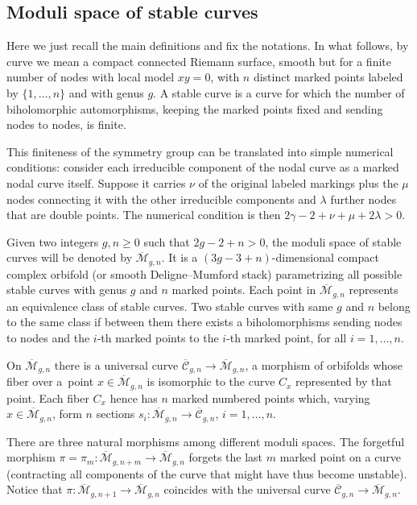 \documentclass[pdftex]{sigma}
\numberwithin{equation}{section}
\newcommand{\oM}{\overline{\mathcal M}}
\newcommand{\<}{\left<}
\renewcommand{\>}{\right>}
\begin{document}
\subsection{Moduli space of stable curves} Here we just recall the main def\/initions and f\/ix the notations. In what follows, by curve we mean a compact connected Riemann surface, smooth but for a f\/inite number of nodes with local model $xy=0$, with $n$ distinct marked points labeled by $\{1,\dots,n\}$ and with genus $g$. A stable curve is a curve for which the number of biholomorphic automorphisms, keeping the marked points f\/ixed and sending nodes to nodes, is f\/inite.

This f\/initeness of the symmetry group can be translated into simple numerical conditions: consider each irreducible component of the nodal curve as a marked nodal curve itself. Suppose it carries $\nu$ of the original labeled markings plus the $\mu$ nodes connecting it with the other irreducible components and $\lambda$ further nodes that are double points. The numerical condition is then $2\gamma-2+\nu+\mu+2\lambda>0$.

Given two integers $g,n\ge 0$ such that $2g-2+n>0$, the moduli space of stable curves will be denoted by $\oM_{g,n}$. It is a $(3g-3+n)$-dimensional compact complex orbifold (or smooth Deligne--Mumford stack) parametrizing all possible stable curves with genus $g$ and $n$ marked points. Each point in $\oM_{g,n}$ represents an equivalence class of stable curves. Two stable curves with same $g$ and $n$ belong to the same class if between them there exists a biholomorphisms sending nodes to nodes and the $i$-th marked points to the $i$-th marked point, for all $i=1,\dots,n$.

On $\oM_{g,n}$ there is a universal curve $\overline{\mathcal{C}}_{g,n} \to \oM_{g,n}$, a morphism of orbifolds whose f\/iber over a~point $x\in \oM_{g,n}$ is isomorphic to the curve $C_x$ represented by that point. Each f\/iber $C_x$ hence has $n$ marked numbered points which, varying $x \in \oM_{g,n}$, form $n$ sections $s_i\colon \oM_{g,n} \to \overline{\mathcal{C}}_{g,n}$, $i=1,\dots,n$.

There are three natural morphisms among dif\/ferent moduli spaces. The forgetful morphism $\pi = \pi_m\colon \oM_{g,n+m} \to \oM_{g,n}$ forgets the last $m$ marked point on a curve (contracting all components of the curve that might have thus become unstable). Notice that $\pi\colon \oM_{g,n+1}\to \oM_{g,n}$ coincides with the universal curve $\overline{\mathcal{C}}_{g,n} \to \oM_{g,n}$.
\end{document}
